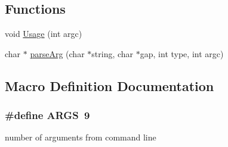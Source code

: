 \subsection*{Functions}
\begin{DoxyCompactItemize}
\item 
void \hyperlink{optjrParam__helper_8hh_a071ae424a27c67719a722878e9f2ab9a}{Usage} (int argc)
\item 
char $\ast$ \hyperlink{optjrParam__helper_8hh_ac15f519b8531039fbfc3380f9de89580}{parse\-Arg} (char $\ast$string, char $\ast$gap, int type, int argc)
\end{DoxyCompactItemize}


\subsection{Macro Definition Documentation}
\hypertarget{optjrParam__helper_8hh_aff1b09d6630c6c0942f78171e74c1b9d}{
\subsubsection[{A\-R\-G\-S}]{\setlength{\rightskip}{0pt plus 5cm}\#define A\-R\-G\-S~9}}\label{optjrParam__helper_8hh_aff1b09d6630c6c0942f78171e74c1b9d}


number of arguments from command line 


